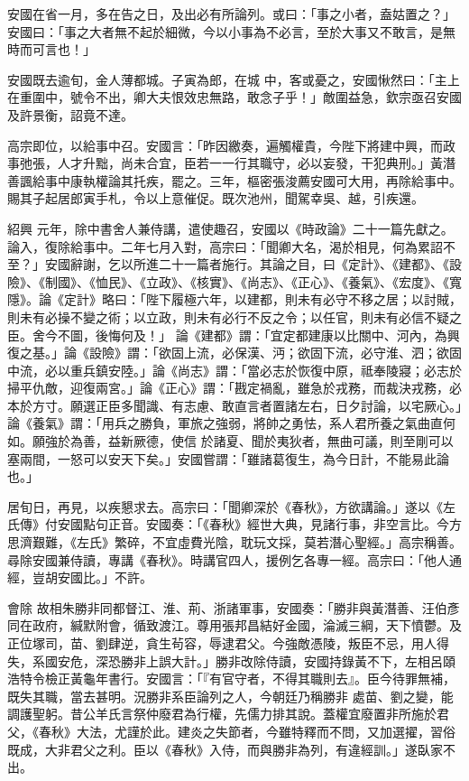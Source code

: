 \begin{pinyinscope}
 安國在省一月，多在告之日，及出必有所論列。或曰：「事之小者，盍姑置之？」安國曰：「事之大者無不起於細微，今以小事為不必言，至於大事又不敢言，是無時而可言也！」



 安國既去逾旬，金人薄都城。子寅為郎，在城
 中，客或憂之，安國愀然曰：「主上在重圍中，號令不出，卿大夫恨效忠無路，敢念子乎！」敵圍益急，欽宗亟召安國及許景衡，詔竟不達。



 高宗即位，以給事中召。安國言：「昨因繳奏，遍觸權貴，今陛下將建中興，而政事弛張，人才升黜，尚未合宜，臣若一一行其職守，必以妄發，干犯典刑。」黃潛善諷給事中康執權論其托疾，罷之。三年，樞密張浚薦安國可大用，再除給事中。賜其子起居郎寅手札，令以上意催促。既次池州，聞駕幸吳、越，引疾還。



 紹興
 元年，除中書舍人兼侍講，遣使趣召，安國以《時政論》二十一篇先獻之。論入，復除給事中。二年七月入對，高宗曰：「聞卿大名，渴於相見，何為累詔不至？」安國辭謝，乞以所進二十一篇者施行。其論之目，曰《定計》、《建都》、《設險》、《制國》、《恤民》、《立政》、《核實》、《尚志》、《正心》、《養氣》、《宏度》、《寬隱》。論《定計》略曰：「陛下履極六年，以建都，則未有必守不移之居；以討賊，則未有必操不變之術；以立政，則未有必行不反之令；以任官，則未有必信不疑之臣。舍今不圖，後悔何及！」
 論《建都》謂：「宜定都建康以比關中、河內，為興復之基。」論《設險》謂：「欲固上流，必保漢、沔；欲固下流，必守淮、泗；欲固中流，必以重兵鎮安陸。」論《尚志》謂：「當必志於恢復中原，祗奉陵寢；必志於掃平仇敵，迎復兩宮。」論《正心》謂：「戡定禍亂，雖急於戎務，而裁決戎務，必本於方寸。願選正臣多聞識、有志慮、敢直言者置諸左右，日夕討論，以宅厥心。」論《養氣》謂：「用兵之勝負，軍旅之強弱，將帥之勇怯，系人君所養之氣曲直何如。願強於為善，益新厥德，使信
 於諸夏、聞於夷狄者，無曲可議，則至剛可以塞兩間，一怒可以安天下矣。」安國嘗謂：「雖諸葛復生，為今日計，不能易此論也。」



 居旬日，再見，以疾懇求去。高宗曰：「聞卿深於《春秋》，方欲講論。」遂以《左氏傳》付安國點句正音。安國奏：「《春秋》經世大典，見諸行事，非空言比。今方思濟艱難，《左氏》繁碎，不宜虛費光陰，耽玩文採，莫若潛心聖經。」高宗稱善。尋除安國兼侍讀，專講《春秋》。時講官四人，援例乞各專一經。高宗曰：「他人通經，豈胡安國比。」不許。



 會除
 故相朱勝非同都督江、淮、荊、浙諸軍事，安國奏：「勝非與黃潛善、汪伯彥同在政府，緘默附會，循致渡江。尊用張邦昌結好金國，淪滅三綱，天下憤鬱。及正位塚司，苗、劉肆逆，貪生茍容，辱逮君父。今強敵憑陵，叛臣不忌，用人得失，系國安危，深恐勝非上誤大計。」勝非改除侍讀，安國持錄黃不下，左相呂頤浩特令檢正黃龜年書行。安國言：「『有官守者，不得其職則去』。臣今待罪無補，既失其職，當去甚明。況勝非系臣論列之人，今朝廷乃稱勝非
 處苗、劉之變，能調護聖躬。昔公羊氏言祭仲廢君為行權，先儒力排其說。蓋權宜廢置非所施於君父，《春秋》大法，尤謹於此。建炎之失節者，今雖特釋而不問，又加選擢，習俗既成，大非君父之利。臣以《春秋》入侍，而與勝非為列，有違經訓。」遂臥家不出。




\end{pinyinscope}

